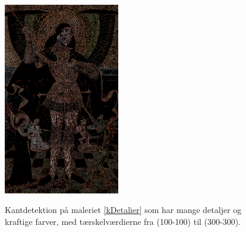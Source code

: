 \begin{figure}[p]
{        \includegraphics[angle=0,width=0.45\textwidth]{afsnit/afprovning/billeder/thressholds/krafitige_farver/krafite_detalier/1_iteration/200-200.png}
        \label{200-200}}
    \hspace{1em}
    \caption{Kantdetektion på maleriet \ref{kDetalier} som har mange
	detaljer og kraftige farver, med tærskelværdierne fra (100-100) til
	(300-300).}
	\label{allesammen1}
\end{figure}

\clearpage

